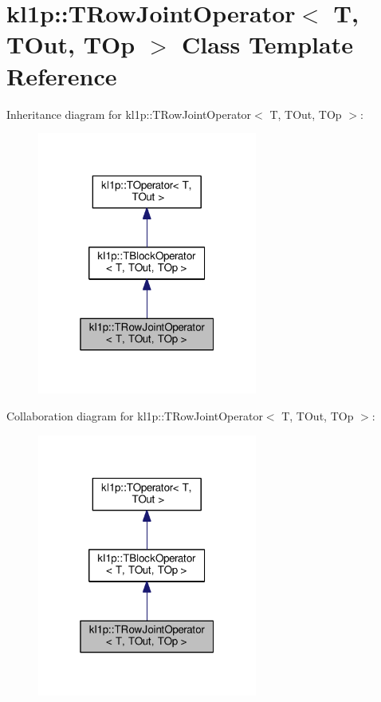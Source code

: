 \hypertarget{classkl1p_1_1TRowJointOperator}{}\section{kl1p\+:\+:T\+Row\+Joint\+Operator$<$ T, T\+Out, T\+Op $>$ Class Template Reference}
\label{classkl1p_1_1TRowJointOperator}


Inheritance diagram for kl1p\+:\+:T\+Row\+Joint\+Operator$<$ T, T\+Out, T\+Op $>$\+:
\nopagebreak
\begin{figure}[H]
\begin{center}
\leavevmode
\includegraphics[width=205pt]{classkl1p_1_1TRowJointOperator__inherit__graph}
\end{center}
\end{figure}


Collaboration diagram for kl1p\+:\+:T\+Row\+Joint\+Operator$<$ T, T\+Out, T\+Op $>$\+:
\nopagebreak
\begin{figure}[H]
\begin{center}
\leavevmode
\includegraphics[width=205pt]{classkl1p_1_1TRowJointOperator__coll__graph}
\end{center}
\end{figure}
